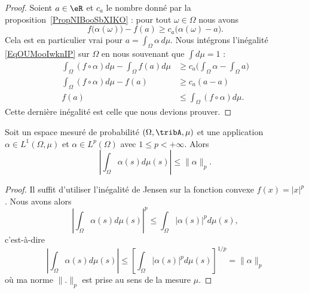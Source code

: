 \begin{proof}
	Soient \( a\in \eR\) et \( c_a\) le nombre donné par la proposition~\ref{PropNIBooSbXIKO} : pour tout \( \omega\in \Omega\) nous avons
	\begin{equation}    \label{EqOUMooIwknIP}
		f\big( \alpha(\omega) \big)-f(a)\geq c_a\big( \alpha(\omega)-a \big).
	\end{equation}
	Cela est en particulier vrai pour \( a=\int_{\Omega}\alpha\,d\mu\). Nous intégrons l'inégalité \eqref{EqOUMooIwknIP} sur \( \Omega\) en nous souvenant que \( \int d\mu=1\) :
	\begin{subequations}
		\begin{align}
			\int_{\Omega}(f\circ \alpha)d\mu-\int_{\Omega}f(a)d\mu & \geq c_a\big( \int_{\Omega}\alpha-\int_{\Omega}a \big) \\
			\int_{\Omega}(f\circ \alpha)d\mu-f(a)                  & \geq c_a(a-a)                                          \\
			f(a)                                                   & \leq \int_{\Omega}(f\circ\alpha)d\mu.
		\end{align}
	\end{subequations}
	Cette dernière inégalité est celle que nous devions prouver.
\end{proof}

\begin{corollary}
	Soit un espace mesuré de probabilité \( (\Omega,\tribA,\mu)\) et une application \( \alpha\in L^1(\Omega,\mu)\) et \( \alpha\in L^p(\Omega)\) avec \( 1\leq p<+\infty\). Alors
	\begin{equation}
		| \int_{\Omega}\alpha(s)d\mu(s) |\leq \| \alpha \|_p.
	\end{equation}
\end{corollary}

\begin{proof}
	Il suffit d'utiliser l'inégalité de Jensen sur la fonction convexe \( f(x)=| x |^p\). Nous avons alors
	\begin{equation}
		| \int_{\Omega}\alpha(s)d\mu(s) |^p\leq \int_{\Omega}| \alpha(s) |^pd\mu(s),
	\end{equation}
	c'est-à-dire
	\begin{equation}
		| \int_{\Omega}\alpha(s)d\mu(s) |\leq  \left[  \int_{\Omega}| \alpha(s) |^pd\mu(s)\right]^{1/p}=\| \alpha \|_p
	\end{equation}
	où ma norme \( \| . \|_p\) est prise au sens de la mesure \( \mu\).
\end{proof}

